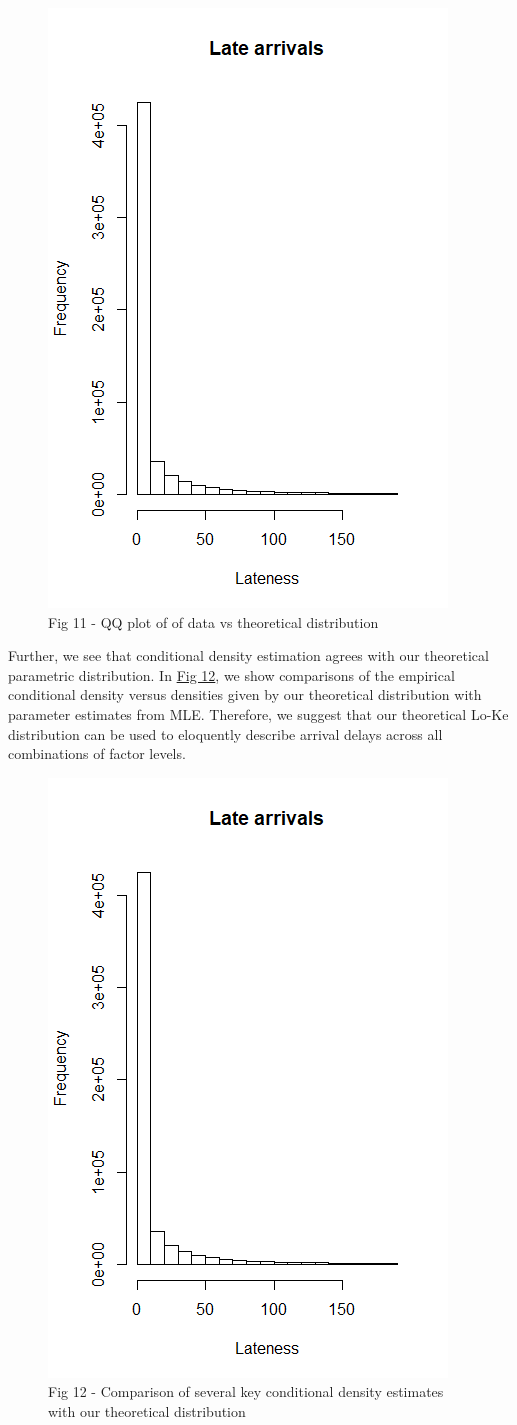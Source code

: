 \documentclass[12pt, a4paper, openany]{book}
\newcommand\tab[1][1cm]{\hspace*{#1}}
\begin{document}
			\begin{figure}
			\centering
	 		\includegraphics[width = .45 \textwidth]{../figures/LateArrivalsHistogram}
	 		\caption{Fig 11  - QQ plot of of data vs theoretical distribution}
	 		\end{figure}
	\tab Further, we see that conditional density estimation agrees with our theoretical parametric distribution. In \underline{Fig 12}, we show comparisons of the empirical conditional density versus densities given by our theoretical distribution with parameter estimates from MLE. Therefore, we suggest that our theoretical Lo-Ke distribution can be used to eloquently describe arrival delays across all combinations of factor levels. \\
			\begin{figure}
			\centering
	 		\includegraphics[width = .45 \textwidth]{../figures/LateArrivalsHistogram}
	 		\caption{Fig 12  - Comparison of several key conditional density estimates with our theoretical distribution}
	 		\end{figure}
\end{document}
